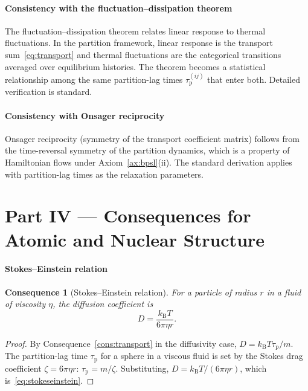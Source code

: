 \documentclass[11pt,twocolumn,a4paper]{article}
\theoremstyle{axiomstyle}
\theoremstyle{conseqstyle}
\newtheorem{consequence}{Consequence}
\theoremstyle{definition}
\theoremstyle{remark}
\newcommand{\kB}{k_{\mathrm{B}}}
\newcommand{\taup}{\tau_{\mathrm{p}}}
\begin{document}
\subsection{Consistency with the fluctuation--dissipation theorem}

The fluctuation--dissipation theorem relates linear response to thermal fluctuations. In the partition framework, linear response is the transport sum~\eqref{eq:transport} and thermal fluctuations are the categorical transitions averaged over equilibrium histories. The theorem becomes a statistical relationship among the same partition-lag times $\taup^{(ij)}$ that enter both. Detailed verification is standard.

\subsection{Consistency with Onsager reciprocity}

Onsager reciprocity (symmetry of the transport coefficient matrix) follows from the time-reversal symmetry of the partition dynamics, which is a property of Hamiltonian flows under Axiom~\ref{ax:bpsl}(ii). The standard derivation applies with partition-lag times as the relaxation parameters.

\clearpage

\part*{Part IV --- Consequences for Atomic and Nuclear Structure}

\subsection{Stokes--Einstein relation}

\begin{consequence}[Stokes--Einstein relation]
\label{cons:stokeseinstein}
For a particle of radius $r$ in a fluid of viscosity $\eta$, the diffusion coefficient is
\begin{equation}
D=\frac{\kB T}{6\pi\eta r}.
\label{eq:stokeseinstein}
\end{equation}
\end{consequence}

\begin{proof}
By Consequence~\ref{cons:transport} in the diffusivity case, $D=\kB T\taup/m$. The partition-lag time $\taup$ for a sphere in a viscous fluid is set by the Stokes drag coefficient $\zeta=6\pi\eta r$: $\taup=m/\zeta$. Substituting, $D=\kB T/(6\pi\eta r)$, which is~\eqref{eq:stokeseinstein}.
\end{proof}
\end{document}
